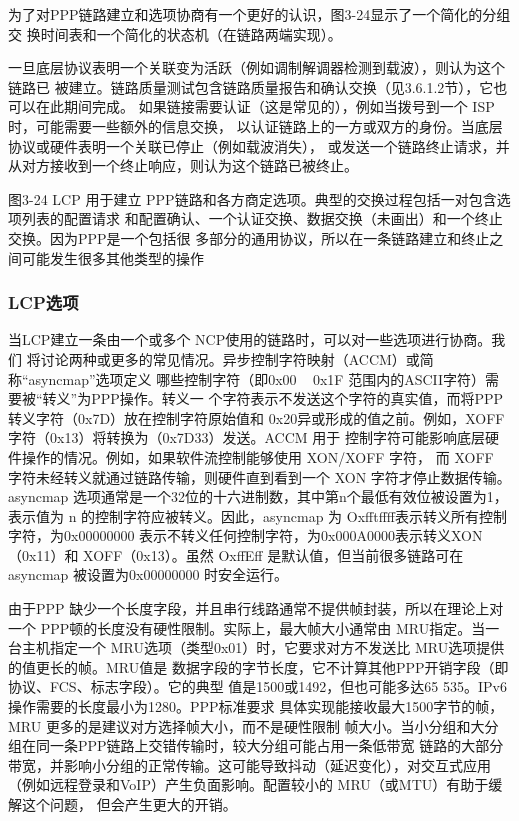 为了对PPP链路建立和选项协商有一个更好的认识，图3-24显示了一个简化的分组交
换时间表和一个简化的状态机（在链路两端实现）。

一旦底层协议表明一个关联变为活跃（例如调制解调器检测到载波），则认为这个链路已
被建立。链路质量测试包含链路质量报告和确认交换（见3.6.1.2节），它也可以在此期间完成。
如果链接需要认证（这是常见的），例如当拨号到一个 ISP 时，可能需要一些额外的信息交换，
以认证链路上的一方或双方的身份。当底层协议或硬件表明一个关联已停止（例如载波消失），
或发送一个链路终止请求，并从对方接收到一个终止响应，则认为这个链路已被终止。

图3-24
LCP 用于建立 PPP链路和各方商定选项。典型的交换过程包括一对包含选项列表的配置请求
和配置确认、一个认证交换、数据交换（未画出）和一个终止交换。因为PPP是一个包括很
多部分的通用协议，所以在一条链路建立和终止之间可能发生很多其他类型的操作

\subsubsection{LCP选项}

当LCP建立一条由一个或多个 NCP使用的链路时，可以对一些选项进行协商。我们
将讨论两种或更多的常见情况。异步控制字符映射（ACCM）或简称“asyncmap”选项定义
哪些控制字符（即0x00 ~ 0x1F 范围内的ASCII字符）需要被“转义”为PPP操作。转义一
个字符表示不发送这个字符的真实值，而将PPP 转义字符（0x7D）放在控制字符原始值和
0x20异或形成的值之前。例如，XOFF字符（0x13）将转换为（0x7D33）发送。ACCM 用于
控制字符可能影响底层硬件操作的情况。例如，如果软件流控制能够使用 XON/XOFF 字符，
而 XOFF 字符未经转义就通过链路传输，则硬件直到看到一个 XON 字符才停止数据传输。
asyncmap 选项通常是一个32位的十六进制数，其中第n个最低有效位被设置为1，表示值为
n 的控制字符应被转义。因此，asyncmap 为 Oxfftffff表示转义所有控制字符，为0x00000000
表示不转义任何控制字符，为0x000A0000表示转义XON（0x11）和 XOFF（0x13）。虽然
OxffEff 是默认值，但当前很多链路可在 asyncmap 被设置为0x00000000 时安全运行。

由于PPP 缺少一个长度字段，并且串行线路通常不提供帧封装，所以在理论上对一个
PPP顿的长度没有硬性限制。实际上，最大帧大小通常由 MRU指定。当一台主机指定一个
MRU选项（类型0x01）时，它要求对方不发送比 MRU选项提供的值更长的帧。MRU值是
数据字段的字节长度，它不计算其他PPP开销字段（即协议、FCS、标志字段）。它的典型
值是1500或1492，但也可能多达65 535。IPv6 操作需要的长度最小为1280。PPP标准要求
具体实现能接收最大1500字节的帧，MRU 更多的是建议对方选择帧大小，而不是硬性限制
帧大小。当小分组和大分组在同一条PPP链路上交错传输时，较大分组可能占用一条低带宽
链路的大部分带宽，并影响小分组的正常传输。这可能导致抖动（延迟变化），对交互式应用
（例如远程登录和VoIP）产生负面影响。配置较小的 MRU（或MTU）有助于缓解这个问题，
但会产生更大的开销。


